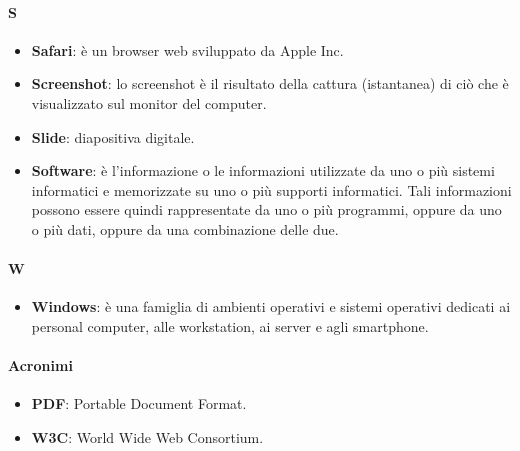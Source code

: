 \paragraph{S}
\begin{itemize}
	\item[] \textbf{Safari}: è un browser web sviluppato da Apple Inc.
	\item[] \textbf{Screenshot}: lo screenshot è il risultato della cattura (istantanea) di ciò che è visualizzato sul monitor del computer.
	\item[] \textbf{Slide}: diapositiva digitale.
	\item[] \textbf{Software}: è l'informazione o le informazioni utilizzate da uno o più sistemi informatici e memorizzate su uno o più supporti informatici. Tali informazioni possono essere quindi rappresentate da uno o più programmi, oppure da uno o più dati, oppure da una combinazione delle due.
\end{itemize}
\newpage


\paragraph{W}
\begin{itemize}
	\item[] \textbf{Windows}: è una famiglia di ambienti operativi e sistemi operativi dedicati ai personal computer, alle workstation, ai server e agli smartphone.
\end{itemize}
\newpage

\paragraph{Acronimi}
\begin{itemize}
	\item[] \textbf{PDF}: Portable Document Format.
	\item[] \textbf{W3C}: World Wide Web Consortium.
\end{itemize}